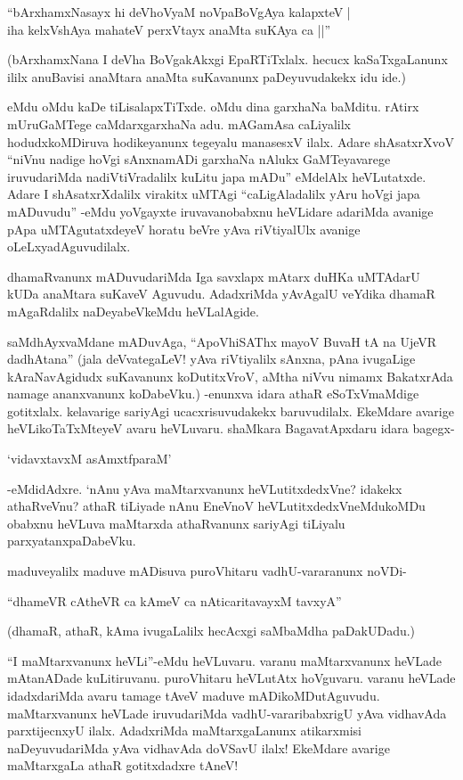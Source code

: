 \begin{shloka}
``bArxhamxNasayx hi deVhoV\s yaM noVpaBoVgAya kalapxteV |\\
iha kelxVshAya mahateV perxVtayx anaMta suKAya ca ||''
\end{shloka}

(bArxhamxNana I deVha BoVgakAkxgi EpaRTiTxlalx. hecucx kaSaTxgaLanunx ililx anuBavisi anaMtara anaMta suKavanunx paDeyuvudakekx idu ide.)

eMdu oMdu kaDe tiLisalapxTiTxde. oMdu dina garxhaNa baMditu. rAtirx mUruGaMTege caMdarxgarxhaNa adu. mAGamAsa caLiyalilx hodudxkoMDiruva hodikeyanunx tegeyalu manasesxV ilalx. Adare shAsatxrXvoV ``niVnu nadige hoVgi sAnxnamADi garxhaNa nAlukx GaMTeyavarege iruvudariMda nadiVtiVradalilx kuLitu japa mADu'' eMdelAlx heVLutatxde. Adare I shAsatxrXdalilx virakitx uMTAgi ``caLigAladalilx yAru hoVgi japa mADuvudu'' -eMdu yoVgayxte iruvavanobabxnu heVLidare adariMda avanige pApa uMTAgutatxdeyeV horatu beVre yAva riVtiyalUlx avanige oLeLxyadAguvudilalx.

dhamaRvanunx mADuvudariMda Iga savxlapx mAtarx duHKa uMTAdarU kUDa anaMtara suKaveV Aguvudu. AdadxriMda yAvAgalU veYdika dhamaR mAgaRdalilx naDeyabeVkeMdu heVLalAgide.

saMdhAyxvaMdane mADuvAga, ``ApoVhiSAThx mayoV BuvaH tA na UjeVR dadhAtana'' (jala deVvategaLeV! yAva riVtiyalilx sAnxna, pAna ivugaLige kAraNavAgidudx suKavanunx koDutitxVroV, aMtha niVvu nimamx BakatxrAda namage ananxvanunx koDabeVku.) -enunxva idara athaR eSoTxVmaMdige gotitxlalx. kelavarige sariyAgi ucacxrisuvudakekx baruvudilalx. EkeMdare avarige heVLikoTaTxMteyeV avaru heVLuvaru. shaMkara BagavatApxdaru idara bagegx-

\begin{shloka}
`vidavxtavxM asAmxtfparaM'
\end{shloka}

-eMdidAdxre. `nAnu yAva maMtarxvanunx heVLutitxdedxVne? idakekx athaRveVnu? athaR tiLiyade nAnu EneVnoV heVLutitxdedxVneMdukoMDu obabxnu heVLuva maMtarxda athaRvanunx sariyAgi tiLiyalu parxyatanxpaDabeVku.

maduveyalilx maduve mADisuva puroVhitaru vadhU-vararanunx noVDi-

\begin{shloka}
``dhameVR cAtheVR ca kAmeV ca nAticaritavayxM tavxyA''
\end{shloka}

(dhamaR, athaR, kAma ivugaLalilx hecAcxgi saMbaMdha paDakUDadu.)

``I maMtarxvanunx heVLi''-eMdu heVLuvaru. varanu maMtarxvanunx heVLade mAtanADade kuLitiruvanu. puroVhitaru heVLutAtx hoVguvaru. varanu heVLade idadxdariMda avaru tamage tAveV maduve mADikoMDutAguvudu. maMtarxvanunx heVLade iruvudariMda vadhU-vararibabxrigU yAva vidhavAda parxtijecnxyU ilalx. AdadxriMda maMtarxgaLanunx atikarxmisi naDeyuvudariMda yAva vidhavAda doVSavU ilalx! EkeMdare avarige maMtarxgaLa athaR gotitxdadxre tAneV!

